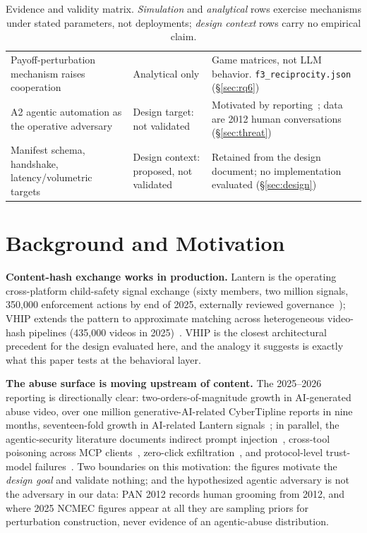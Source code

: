 \documentclass[letterpaper,twocolumn,10pt]{article}
\begin{document}
\begin{table}[!t]
\begin{tabular}{@{}p{5.6cm} p{3.6cm} p{7.6cm}@{}}
Payoff-perturbation mechanism raises cooperation & Analytical only & Game matrices, not LLM behavior. \texttt{f3\_reciprocity.json} (\S\ref{sec:rq6}) \\
A2 agentic automation as the operative adversary & Design target: not validated & Motivated by reporting~\cite{lantern2026}; data are 2012 human conversations (\S\ref{sec:threat}) \\
Manifest schema, handshake, latency/volumetric targets & Design context: proposed, not validated & Retained from the design document; no implementation evaluated (\S\ref{sec:design}) \\
\bottomrule
\end{tabular}
\caption{Evidence and validity matrix. \emph{Simulation} and \emph{analytical} rows exercise mechanisms under stated parameters, not deployments; \emph{design context} rows carry no empirical claim.}
\label{tab:evidence}
\end{table}

\section{Background and Motivation}
\label{sec:background}

\textbf{Content-hash exchange works in production.} Lantern is the operating
cross-platform child-safety signal exchange (sixty members, two million
signals, 350{,}000 enforcement actions by end of 2025, externally reviewed
governance~\cite{lantern2026,bsrhria}); VHIP extends the pattern to
approximate matching across heterogeneous video-hash pipelines (435{,}000
videos in 2025)~\cite{lantern2026}. VHIP is the closest architectural
precedent for the design evaluated here, and the analogy it suggests is
exactly what this paper tests at the behavioral layer.

\textbf{The abuse surface is moving upstream of content.} The 2025--2026
reporting is directionally clear: two-orders-of-magnitude growth in
AI-generated abuse video, over one million generative-AI-related CyberTipline
reports in nine months, seventeen-fold growth in AI-related Lantern
signals~\cite{lantern2026}; in parallel, the agentic-security literature
documents indirect prompt injection~\cite{greshake2023}, cross-tool
poisoning across MCP clients~\cite{mcpclients2026}, zero-click
exfiltration~\cite{echoleak2025}, and protocol-level trust-model
failures~\cite{sok2026promptinjection,mcprce2026,breakingprotocol2026}.
Two boundaries on this motivation: the figures motivate the \emph{design
goal} and validate nothing; and the hypothesized agentic adversary is not
the adversary in our data: PAN 2012 records human grooming from 2012, and
where 2025 NCMEC figures appear at all they are sampling priors for
perturbation construction, never evidence of an agentic-abuse distribution.
\end{document}
